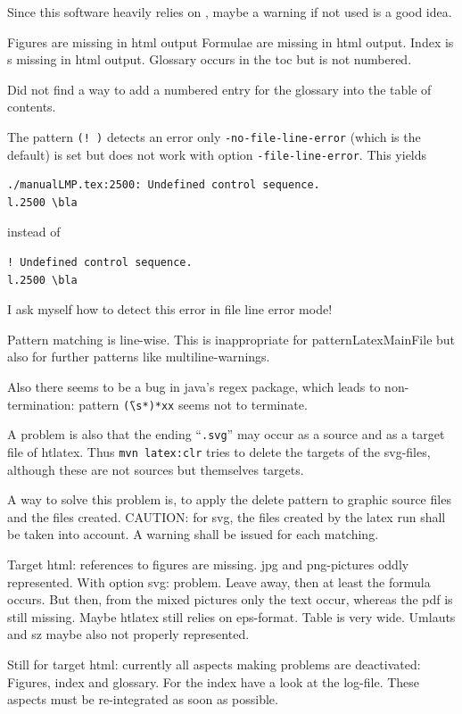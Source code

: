Since this software heavily relies on , 
maybe a warning if not used is a good idea. 

Figures are missing in html output 
Formulae are missing in html output. 
Index is s missing in html output. 
Glossary occurs in the toc but is not numbered. 

Did not find a way to add a numbered entry for the glossary 
into the table of contents. 

The pattern \texttt{(!\ )} detects an error only %
\texttt{-no-file-line-error} (which is the default) is set 
but does not work with option \texttt{-file-line-error}. 
This yields 
%
\begin{verbatim}
./manualLMP.tex:2500: Undefined control sequence.
l.2500 \bla
\end{verbatim}
%
instead of 
%
\begin{verbatim}
! Undefined control sequence.
l.2500 \bla
\end{verbatim}

I ask myself how to detect this error in file line error mode! 


Pattern matching is line-wise. 
This is inappropriate for patternLatexMainFile 
but also for further patterns like multiline-warnings. 

Also there seems to be a bug in java's regex package, 
which leads to non-termination: 
pattern \texttt{\~(\textbackslash s*)*xx} seems not to terminate. %

A problem is also that the ending ``\texttt{.svg}'' may occur as a source 
and as a target file of htlatex. 
Thus \texttt{mvn latex:clr} tries to delete the targets of the svg-files, 
although these are not sources but themselves targets. 

A way to solve this problem is, 
to apply the delete pattern to graphic source files 
and the files created. 
CAUTION\@: for svg, 
the files created by the latex run shall be taken into account. 
A warning shall be issued for each matching. 


Target html: references to figures are missing. 
jpg and png-pictures oddly represented. 
With option svg: problem. 
Leave away, then at least the formula occurs. 
But then, from the mixed pictures only the text occur, 
whereas the pdf is still missing. 
Maybe htlatex still relies on eps-format. 
Table is very wide. 
Umlauts and sz maybe also not properly represented. 

Still for target html: currently all aspects making problems 
are deactivated: 
Figures, index and glossary. 
For the index have a look at the log-file. 
These aspects must be re-integrated as soon as possible. 

